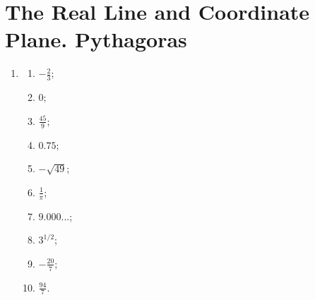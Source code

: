 \section{The Real Line and Coordinate Plane. Pythagoras}

\begin{enumerate}
    \item {}
    
    \begin{multicols}{2}
        \begin{enumerate}[label=(\alph*)]
            \item $-\frac{2}{3}$;
            \item $0$;
            \item $\frac{45}{9}$;
            \item $0.75$;
            \item $-\sqrt{49}$;
            \item $\frac{1}{\pi}$;
            \item $9.000...$;
            \item $3^{1/2}$;
            \item $-\frac{20}{7}$;
            \item $\frac{94}{7}$.
        \end{enumerate}
    \end{multicols}
\end{enumerate}